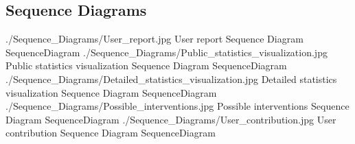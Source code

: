 \documentclass[../../../rasd.tex]{subfiles}
\begin{document}
\subsection{Sequence Diagrams\label{sect:3.2.4}}

\image {10cm} {./Sequence_Diagrams/User_report.jpg} {User report Sequence Diagram} {SequenceDiagram}
\image {7cm} {./Sequence_Diagrams/Public_statistics_visualization.jpg} {Public statistics visualization Sequence Diagram} {SequenceDiagram}
\image {8cm} {./Sequence_Diagrams/Detailed_statistics_visualization.jpg} {Detailed statistics visualization Sequence Diagram} {SequenceDiagram}
\image {5cm} {./Sequence_Diagrams/Possible_interventions.jpg} {Possible interventions Sequence Diagram} {SequenceDiagram}
\image {6cm} {./Sequence_Diagrams/User_contribution.jpg} {User contribution Sequence Diagram} {SequenceDiagram} 
\end{document}
